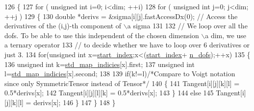 \begin{DoxyCode}
126     \{
127         \textcolor{keywordflow}{for} ( \textcolor{keywordtype}{unsigned} \textcolor{keywordtype}{int} i=0; i<dim; ++i)
128             \textcolor{keywordflow}{for} ( \textcolor{keywordtype}{unsigned} \textcolor{keywordtype}{int} j=0; j<dim; ++j )
129             \{
130                 \textcolor{keywordtype}{double} *derivs = &sigma[i][j].fastAccessDx(0); \textcolor{comment}{// Access the derivatives of the (i,j)-th
       component of \(\backslash\)a sigma}
131                 
132                 \textcolor{comment}{// We loop over all the dofs. To be able to use this independent of the chosen dimension \(\backslash\)a
       dim, we use a ternary operator}
133                 \textcolor{comment}{// to decide whether we have to loop over 6 derivatives or just 3.}
134                 \textcolor{keywordflow}{for}(\textcolor{keywordtype}{unsigned} \textcolor{keywordtype}{int} x=\hyperlink{classSacado__Wrapper_1_1SymTensor_afe921e6044e4110fcfc848c52844d650}{start\_index};x<(\hyperlink{classSacado__Wrapper_1_1SymTensor_afe921e6044e4110fcfc848c52844d650}{start\_index}+
      \hyperlink{classSacado__Wrapper_1_1SymTensor_a733bc4b029ff8d067b48e7ce3ee7606b}{n\_dofs});++x)
135                 \{
136                     \textcolor{keywordtype}{unsigned} \textcolor{keywordtype}{int} k=\hyperlink{classSacado__Wrapper_1_1SymTensor_ae3b1c56cde3fc5c7805b618ef3d9de75}{std\_map\_indicies}[x].first;
137                     \textcolor{keywordtype}{unsigned} \textcolor{keywordtype}{int} l=\hyperlink{classSacado__Wrapper_1_1SymTensor_ae3b1c56cde3fc5c7805b618ef3d9de75}{std\_map\_indicies}[x].second;
138 
139                     \textcolor{keywordflow}{if}(k!=l)\textcolor{comment}{/*Compare to Voigt notation since only SymmetricTensor instead of Tensor*/}
140                     \{
141                         Tangent[i][j][k][l] = 0.5*derivs[x];
142                         Tangent[i][j][l][k] = 0.5*derivs[x];
143                     \}
144                     \textcolor{keywordflow}{else}
145                         Tangent[i][j][k][l] = derivs[x];
146                 \}
147             \}
148     \}
\end{DoxyCode}
